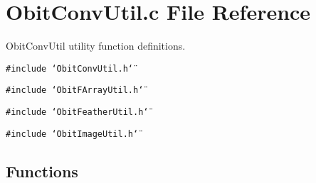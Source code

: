 \section{Obit\-Conv\-Util.c File Reference}
\label{ObitConvUtil_8c}
Obit\-Conv\-Util utility function definitions. 

{\tt \#include \char`\"{}Obit\-Conv\-Util.h\char`\"{}}\par
{\tt \#include \char`\"{}Obit\-FArray\-Util.h\char`\"{}}\par
{\tt \#include \char`\"{}Obit\-Feather\-Util.h\char`\"{}}\par
{\tt \#include \char`\"{}Obit\-Image\-Util.h\char`\"{}}\par
\subsection*{Functions}
